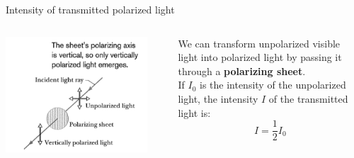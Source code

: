 \begin{frame}{Intensity of transmitted polarized light}

\begin{columns}
  \begin{column}{0.40\textwidth}
    \begin{center}
       \includegraphics[width=0.90\textwidth]{./images/schematics/unpolarized_light_sent_through_filter.png}\\
    \end{center}
  \end{column}
  \begin{column}{0.60\textwidth}
      We can transform unpolarized visible light into polarized light by passing
      it through a {\bf polarizing sheet}.\\
      \vspace{0.2cm}
      If $I_0$ is the intensity of the unpolarized light,
      the intensity $I$ of the transmitted light is:
      \begin{equation*}
        I = \frac{1}{2}I_0
      \end{equation*}
  \end{column}
\end{columns}


\end{frame}
